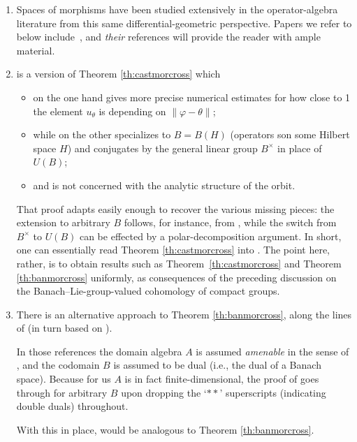 \documentclass[10pt,a4paper]{amsart}
\numberwithin{equation}{section}
\begin{document}
\begin{Remarks}\label{res:wogen}\quad
 \begin{enumerate}[(1)]\itemsep=0pt
 \item Spaces of morphisms have been studied extensively in the operator-algebra literature from this same differential-geometric perspective. Papers we refer to below include~\cite{acs,cg-average,cg-amen}, and {\it their} references will provide the reader with ample material.
 \item\label{item:acs} \cite[Proposition 2.2]{acs} is a version of Theorem \ref{th:castmorcross} which
 \begin{itemize}\itemsep=0pt
 \item on the one hand gives more precise numerical estimates for how close to 1 the element $u_{\theta}$ is depending on $\|\varphi-\theta\|$;
 \item while on the other specializes to $B=B(H)$ (operators son some Hilbert space $H$) and conjugates by the general linear group $B^{\times}$ in place of $U(B)$;
 \item and is not concerned with the analytic structure of the orbit.
 \end{itemize}
 That proof adapts easily enough to recover the various missing pieces: the extension to arbitrary $B$ follows, for instance, from \cite[Remark~2.4]{acs}, while the switch from $B^{\times}$ to $U(B)$ can be effected by a polar-decomposition argument. In short, one can essentially read Theorem \ref{th:castmorcross} into \cite[Proposition 2.2]{acs}. The point here, rather, is to obtain results such as Theorem~\ref{th:castmorcross} and Theorem \ref{th:banmorcross} uniformly, as consequences of the preceding discussion on the Banach--Lie-group-valued cohomology of compact groups.

 \item There is an alternative approach to Theorem \ref{th:banmorcross}, along the lines of \cite[Proposition 8.2.2 and Theorem 8.2.3]{run-lec} (in turn based on \cite[Proposition 4.1 and Theorem 4.5]{cg-amen}).

 In those references the domain algebra $A$ is assumed {\it amenable} in the sense of \cite[Definition~2.1.9]{run-lec}, and the codomain $B$ is assumed to be dual (i.e., the dual of a Banach space). Because for us $A$ is in fact finite-dimensional, the proof of \cite[Theorem 8.2.1]{run-lec} goes through for arbitrary $B$ upon dropping the `$**$' superscripts (indicating double duals) throughout.

 With this in place, \cite[Proposition 8.2.2 and part of Proposition 8.2.3]{run-lec} would be analogous to Theorem \ref{th:banmorcross}.
 \end{enumerate}
\end{Remarks}
\end{document}
